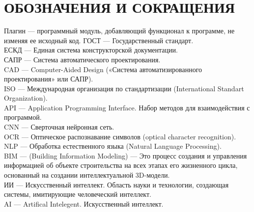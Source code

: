 \section*{ОБОЗНАЧЕНИЯ И СОКРАЩЕНИЯ}
Плагин --- программный модуль, добавляющий функционал к программе, не изменяя ее исходный код.
ГОСТ --- Государственный стандарт.\\
ЕСКД --- Единая система конструкторской документации.\\
САПР --- Система автоматического проектирования.\\
CAD --- Computer-Aided Design («Система автоматизированного проектирования» или САПР). \\ 
ISO --- Международная организация по стандартизации (International Standart Organization). \\
API --- Application Programming Interface. Набор методов для взаимодействия с программой. \\
CNN --- Сверточная нейронная сеть. \\
OCR --- Оптическое распознавание символов (optical character recognition). \\
NLP --- Обработка естественного языка (Natural Language Processing). \\
BIM --- (Building Information Modeling) --- Это процесс создания и управления информацией об объекте строительства
на всех этапах его жизненного цикла, основанный на создании интеллектуальной 3D-модели. \\
ИИ --- Искусственный интеллект. Область науки и технологии, создающая системы,
имитирующие человеческий интеллект. \\
AI --- Artifical Intelegent. Искусственный интеллект. \\

\clearpage
